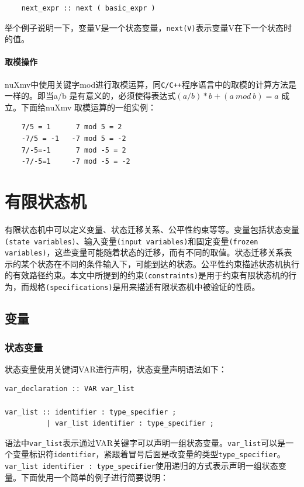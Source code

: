 \begin{lstlisting}
    next_expr :: next ( basic_expr )
\end{lstlisting}

举个例子说明一下，变量V是一个状态变量，\verb|next(V)|表示变量V在下一个状态时的值。

\paragraph{取模操作}
nuXmv中使用关键字mod进行取模运算，同\verb|C/C++|程序语言中的取模的计算方法是一样的。即当a/b 是有意义的，必须使得表达式$\left(a/b\right) * b + \left(a \ mod \ b\right) = a$ 成立。下面给nuXmv 取模运算的一组实例：

\begin{lstlisting}
    7/5 = 1      7 mod 5 = 2
    -7/5 = -1   -7 mod 5 = -2
    7/-5=-1      7 mod -5 = 2
    -7/-5=1     -7 mod -5 = -2
\end{lstlisting}

\section{有限状态机}
有限状态机中可以定义变量、状态迁移关系、公平性约束等等。变量包括状态变量\verb|(state variables)|、输入变量\verb|(input variables)|和固定变量\verb|(frozen variables)|，这些变量可能随着状态的迁移，而有不同的取值。状态迁移关系表示的某个状态在不同的条件输入下，可能到达的状态。公平性约束描述状态机执行的有效路径约束。本文中所提到的约束\verb|(constraints)|是用于约束有限状态机的行为，而规格\verb|(specifications)|是用来描述有限状态机中被验证的性质。

\subsection{变量}
\subsubsection{状态变量}
状态变量使用关键词VAR进行声明，状态变量声明语法如下：

\begin{lstlisting}
var_declaration :: VAR var_list

var_list :: identifier : type_specifier ;
          | var_list identifier : type_specifier ;
\end{lstlisting}

语法中\verb|var_list|表示通过VAR关键字可以声明一组状态变量。\verb|var_list|可以是一个变量标识符\verb|identifier|，紧跟着冒号后面是改变量的类型\verb|type_specifier|。\verb|var_list identifier : type_specifier|使用递归的方式表示声明一组状态变量。下面使用一个简单的例子进行简要说明：

